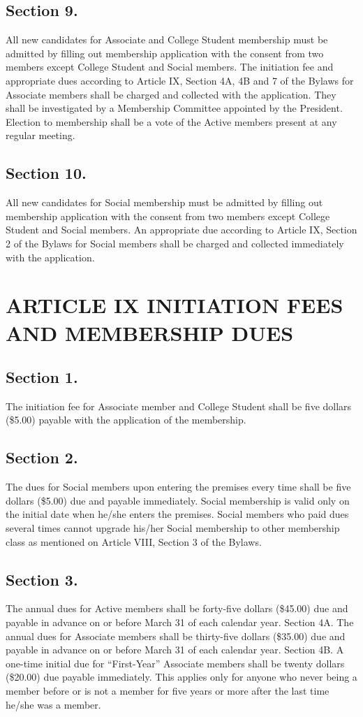 \documentclass[12pt,letterpaper]{article}
\begin{document}
\subsection*{Section 9.} All new candidates for Associate and College Student membership must be
admitted by filling out membership application with the consent from two members
except College Student and Social members. The initiation fee and appropriate dues
according to Article IX, Section 4A, 4B and 7 of the Bylaws for Associate members shall
be charged and collected with the application. They shall be investigated by a
Membership Committee appointed by the President. Election to membership shall be a
vote of the Active members present at any regular meeting.
\subsection*{Section 10.} All new candidates for Social membership must be admitted by filling out
membership application with the consent from two members except College Student and
Social members. An appropriate due according to Article IX, Section 2 of the Bylaws for
Social members shall be charged and collected immediately with the application.

\section*{ARTICLE IX
INITIATION FEES AND MEMBERSHIP DUES}

\subsection*{Section 1.} The initiation fee for Associate member and College Student shall be five
dollars (\$5.00) payable with the application of the membership.
\subsection*{Section 2.} The dues for Social members upon entering the premises every time shall be
five dollars (\$5.00) due and payable immediately. Social membership is valid only on
the initial date when he/she enters the premises. Social members who paid dues several
times cannot upgrade his/her Social membership to other membership class as
mentioned on Article VIII, Section 3 of the Bylaws.
\subsection*{Section 3.} The annual dues for Active members shall be forty-five dollars (\$45.00) due
and payable in advance on or before March 31 of each calendar year.
Section 4A.
The annual dues for Associate members shall be thirty-five dollars
(\$35.00) due and payable in advance on or before March 31 of each calendar year.
Section 4B.
A one-time initial due for “First-Year” Associate members shall be
twenty dollars (\$20.00) due payable immediately. This applies only for anyone who
never being a member before or is not a member for five years or more after the last
time he/she was a member.
\end{document}
